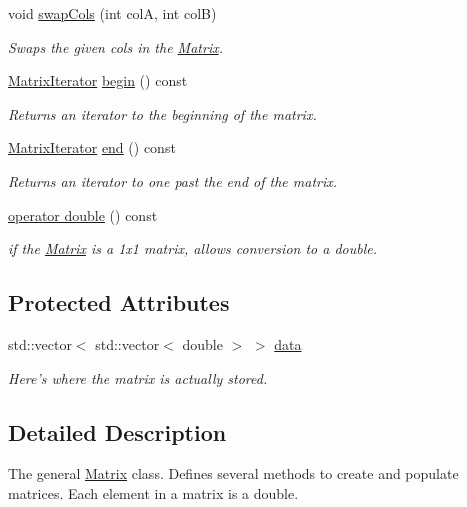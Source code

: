 \begin{DoxyCompactItemize}
void \hyperlink{class_matrix_a505f924baa7c236280751499da56ecee}{swapCols} (int colA, int colB)
\begin{DoxyCompactList}\small\item\em Swaps the given cols in the \hyperlink{class_matrix}{Matrix}. \item\end{DoxyCompactList}\item 
\hyperlink{class_matrix_iterator}{MatrixIterator} \hyperlink{class_matrix_a8969f52f950b124d5a40128c3df11efe}{begin} () const 
\begin{DoxyCompactList}\small\item\em Returns an iterator to the beginning of the matrix. \item\end{DoxyCompactList}\item 
\hyperlink{class_matrix_iterator}{MatrixIterator} \hyperlink{class_matrix_aa6e886dcd213fdf5c54743f3b8ac7209}{end} () const 
\begin{DoxyCompactList}\small\item\em Returns an iterator to one past the end of the matrix. \item\end{DoxyCompactList}\item 
\hyperlink{class_matrix_a94d5e009cbba7556f48a720cff9eedbe}{operator double} () const 
\begin{DoxyCompactList}\small\item\em if the \hyperlink{class_matrix}{Matrix} is a 1x1 matrix, allows conversion to a double. \item\end{DoxyCompactList}\end{DoxyCompactItemize}
\subsection*{Protected Attributes}
\begin{DoxyCompactItemize}
\item 
std::vector$<$ std::vector$<$ double $>$ $>$ \hyperlink{class_matrix_adab4557133e13b08ae470a8e5df7b99c}{data}
\begin{DoxyCompactList}\small\item\em Here's where the matrix is actually stored. \item\end{DoxyCompactList}\end{DoxyCompactItemize}


\subsection{Detailed Description}
The general \hyperlink{class_matrix}{Matrix} class. Defines several methods to create and populate matrices. Each element in a matrix is a double.

